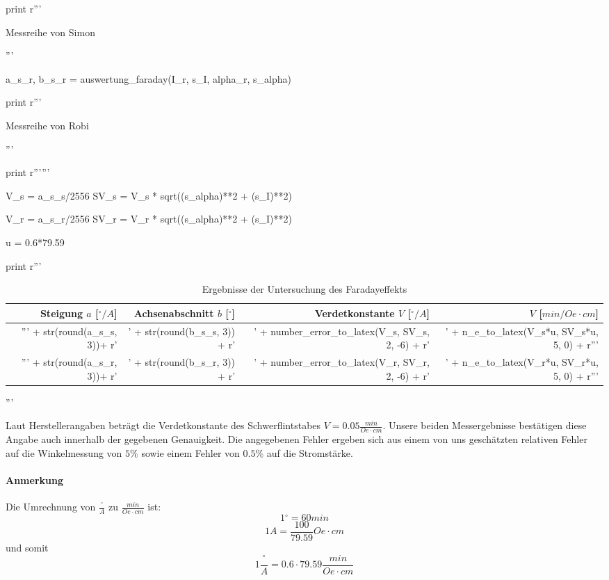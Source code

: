 \begin{python}
\begin{table}[H]
\begin{minipage}[b]{0.5\linewidth}
print r'''  \caption{Messreihe von Simon}
	  \end{minipage}
	  \begin{minipage}[b]{0.5\linewidth}
	    \centering
           '''

a_s_r, b_s_r = auswertung_faraday(I_r, s_I, alpha_r, s_alpha)

print r'''\caption{Messreihe von Robi}
	  \end{minipage}
          \end{table} '''




print r'''\faradayDesc'''

V_s = a_s_s/2556
SV_s = V_s * sqrt((s_alpha)**2 + (s_I)**2)

V_r = a_s_r/2556
SV_r = V_r * sqrt((s_alpha)**2 + (s_I)**2)

u = 0.6*79.59

print r'''
\begin{table}[H]
\begin{tabular}{rrrr}
 \toprule
 Steigung $a$ [${}^{\circ}/A$] & Achsenabschnitt $b$ [${}^{\circ}$] & Verdetkonstante $V$ [${}^{\circ}/A$] & $V$ [$min/Oe \cdot cm$] \\
 \midrule
''' + str(round(a_s_s, 3))+ r' & ' + str(round(b_s_s, 3)) + r' & ' + number_error_to_latex(V_s, SV_s, 2, -6) + r' & ' + n_e_to_latex(V_s*u, SV_s*u, 5, 0) + r'''\\
''' + str(round(a_s_r, 3))+ r' & ' + str(round(b_s_r, 3)) + r' & ' + number_error_to_latex(V_r, SV_r, 2, -6) + r' & ' + n_e_to_latex(V_r*u, SV_r*u, 5, 0) + r'''\\
 \bottomrule  
\end{tabular}
\caption{Ergebnisse der Untersuchung des Faradayeffekts}
\end{table}

'''

\end{python}

Laut Herstellerangaben beträgt die Verdetkonstante des Schwerflintstabes $V = 0.05 \frac{min}{Oe \cdot cm}$. Unsere beiden Messergebnisse bestätigen diese Angabe auch innerhalb der gegebenen Genauigkeit. Die angegebenen Fehler ergeben sich aus einem von uns geschätzten relativen Fehler auf die Winkelmessung von $5\%$ sowie einem Fehler von $0.5\%$ auf die Stromstärke. 

\paragraph{Anmerkung}
Die Umrechnung von $\frac{{}^{\circ}}{A}$ zu $\frac{min}{Oe \cdot cm}$ ist:
$$ 1 {}^{\circ} = 60 min $$
$$ 1 A = \frac{100}{79.59}Oe \cdot cm $$
und somit
$$ 1 \frac{{}^{\circ}}{A} = 0.6 \cdot 79.59  \frac{min}{Oe \cdot cm} $$

